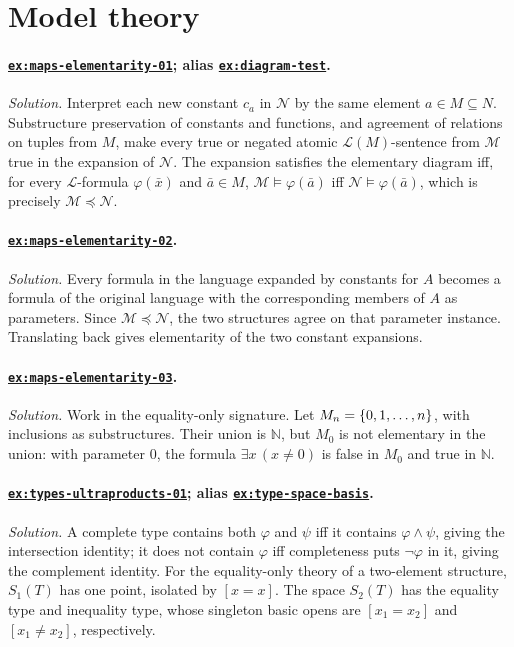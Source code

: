 \documentclass[11pt,oneside,openany]{book}
\theoremstyle{definition}
\theoremstyle{plain}
\theoremstyle{remark}
\DeclarePairedDelimiter{\set}{\lbrace}{\rbrace}
\newcommand{\N}{\mathbb{N}}
\newcommand{\Lang}{\mathcal{L}}
\newcommand{\entails}{\models}
\begin{document}
\section{Model theory}

\paragraph{\hyperref[ex:maps-elementarity-01]{\texttt{ex:maps-elementarity-01}};
alias \hyperref[ex:diagram-test]{\texttt{ex:diagram-test}}.}
\textit{Solution.}  Interpret each new constant \(c_a\) in \(\mathcal N\) by
the same element \(a\in M\subseteq N\).  Substructure preservation of
constants and functions, and agreement of relations on tuples from \(M\), make
every true or negated atomic \(\Lang(M)\)-sentence from \(\mathcal M\) true in
the expansion of \(\mathcal N\).  The expansion satisfies the elementary
diagram iff, for every \(\Lang\)-formula \(\varphi(\bar x)\) and
\(\bar a\in M\),
\(\mathcal M\entails\varphi(\bar a)\) iff
\(\mathcal N\entails\varphi(\bar a)\), which is precisely
\(\mathcal M\preccurlyeq\mathcal N\).

\paragraph{\hyperref[ex:maps-elementarity-02]{\texttt{ex:maps-elementarity-02}}.}
\textit{Solution.}  Every formula in the language expanded by constants for
\(A\) becomes a formula of the original language with the corresponding
members of \(A\) as parameters.  Since \(\mathcal M\preccurlyeq\mathcal N\),
the two structures agree on that parameter instance.  Translating back gives
elementarity of the two constant expansions.

\paragraph{\hyperref[ex:maps-elementarity-03]{\texttt{ex:maps-elementarity-03}}.}\mbox{}\par
\noindent
\textit{Solution.}  Work in the equality-only signature.  Let
\(M_n=\set{0,1,\ldots,n}\), with inclusions as substructures.  Their union is
\(\N\), but \(M_0\) is not elementary in the union: with parameter \(0\), the
formula \(\exists x\,(x\ne0)\) is false in \(M_0\) and true in \(\N\).

\paragraph{\hyperref[ex:types-ultraproducts-01]{\texttt{ex:types-ultraproducts-01}};
alias \hyperref[ex:type-space-basis]{\texttt{ex:type-space-basis}}.}
\textit{Solution.}  A complete type contains both \(\varphi\) and \(\psi\)
iff it contains \(\varphi\land\psi\), giving the intersection
identity; it does not contain \(\varphi\) iff completeness puts \(\neg\varphi\)
in it, giving the complement identity.  For the equality-only theory of a
two-element structure, \(S_1(T)\) has one point, isolated by \([x=x]\).
The space \(S_2(T)\) has the equality type and inequality type, whose singleton
basic opens are \([x_1=x_2]\) and \([x_1\ne x_2]\), respectively.
\end{document}
